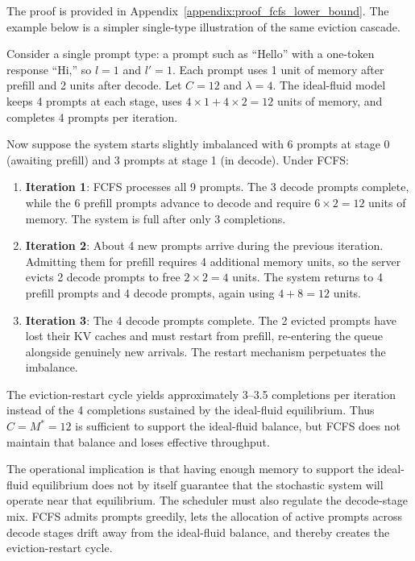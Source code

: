 The proof is provided in Appendix~\ref{appendix:proof_fcfs_lower_bound}. The example below is a simpler single-type illustration of the same eviction cascade.

\begin{example}
\label{ex:fcfs_cascade}
Consider a single prompt type: a prompt such as ``Hello'' with a one-token response ``Hi,'' so \(l=1\) and \(l'=1\). Each prompt uses 1 unit of memory after prefill and 2 units after decode. Let \(C=12\) and \(\lambda=4\). The ideal-fluid model keeps 4 prompts at each stage, uses \(4 \times 1 + 4 \times 2 = 12\) units of memory, and completes 4 prompts per iteration.

Now suppose the system starts slightly imbalanced with 6 prompts at stage 0 (awaiting prefill) and 3 prompts at stage 1 (in decode). Under FCFS:
\begin{enumerate}
    \item \textbf{Iteration 1}: FCFS processes all 9 prompts. The 3 decode prompts complete, while the 6 prefill prompts advance to decode and require \(6 \times 2 = 12\) units of memory. The system is full after only 3 completions.
    \item \textbf{Iteration 2}: About 4 new prompts arrive during the previous iteration. Admitting them for prefill requires 4 additional memory units, so the server evicts 2 decode prompts to free \(2 \times 2 = 4\) units. The system returns to 4 prefill prompts and 4 decode prompts, again using \(4+8=12\) units.
    \item \textbf{Iteration 3}: The 4 decode prompts complete. The 2 evicted prompts have lost their KV caches and must restart from prefill, re-entering the queue alongside genuinely new arrivals. The restart mechanism perpetuates the imbalance.
\end{enumerate}
The eviction-restart cycle yields approximately 3--3.5 completions per iteration instead of the 4 completions sustained by the ideal-fluid equilibrium. Thus \(C=M^*=12\) is sufficient to support the ideal-fluid balance, but FCFS does not maintain that balance and loses effective throughput.
\end{example}

The operational implication is that having enough memory to support the ideal-fluid equilibrium does not by itself guarantee that the stochastic system will operate near that equilibrium. The scheduler must also regulate the decode-stage mix. FCFS admits prompts greedily, lets the allocation of active prompts across decode stages drift away from the ideal-fluid balance, and thereby creates the eviction-restart cycle.

